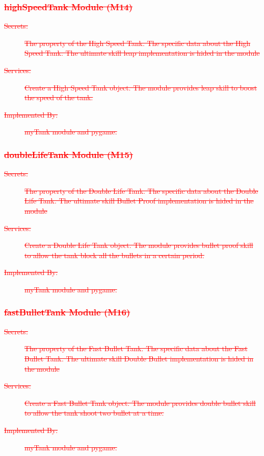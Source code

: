 \documentclass[12pt, titlepage]{article}
\DeclareRobustCommand{\hsout}[1]{\texorpdfstring{\sout{#1}}{#1}}
\begin{document}
\subsubsection{\textcolor{red}{\hsout{highSpeedTank Module (M14)}}}
\begin{description}
\item[\textcolor{red}{\sout{Secrets:}}]\textcolor{red}{\sout{The property of the High Speed Tank. The specific data about the High Speed Tank. The ultimate skill leap implementation is hided in the module}}
\item[\textcolor{red}{\sout{Services:}}] \textcolor{red}{\sout{Create a High Speed Tank object. The module provides leap skill to boost the speed of the tank.}}
\item[\textcolor{red}{\sout{Implemented By:}}] \textcolor{red}{\sout{myTank module and pygame.}}
\end{description}

\subsubsection{\textcolor{red}{\hsout{doubleLifeTank Module  (M15)}}}
\begin{description}
\item[\textcolor{red}{\sout{Secrets:}}]\textcolor{red}{\sout{The property of the Double Life Tank. The specific data about the Double Life Tank. The ultimate skill Bullet Proof implementation is hided in the module}}
\item[\textcolor{red}{\sout{Services:}}] \textcolor{red}{\sout{Create a Double Life Tank object. The module provides bullet proof skill to allow the tank block all the bullets in a certain period.}}
\item[\textcolor{red}{\sout{Implemented By:}}] \textcolor{red}{\sout{myTank module and pygame.}}
\end{description}

\subsubsection{\textcolor{red}{\hsout{fastBulletTank Module (M16)}}}
\begin{description}
\item[\textcolor{red}{\sout{Secrets:}}]\textcolor{red}{\sout{The property of the Fast Bullet Tank. The specific data about the Fast Bullet Tank. The ultimate skill Double Bullet implementation is hided in the module}}
\item[\textcolor{red}{\sout{Services:}}] \textcolor{red}{\sout{Create a Fast Bullet Tank object. The module provides double bullet skill to allow the tank shoot two bullet at a time.}}
\item[\textcolor{red}{\sout{Implemented By:}}] \textcolor{red}{\sout{myTank module and pygame.}}
\end{description}
\end{document}
